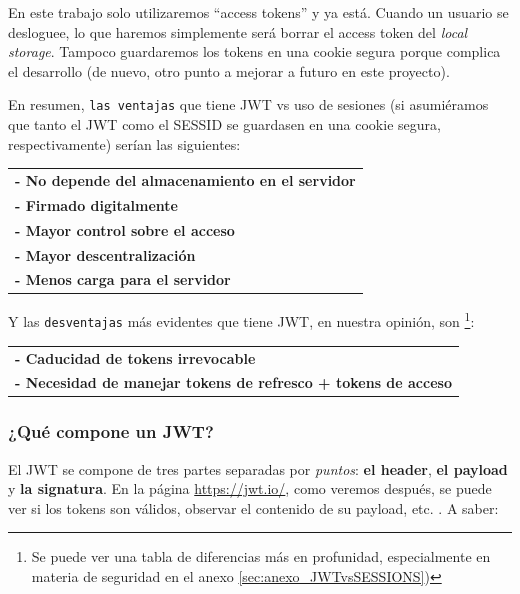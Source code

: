 \documentclass[a4paper,12pt]{report}
\begin{document}
				
				
				En este trabajo solo utilizaremos ``access tokens'' y ya está. Cuando un usuario se desloguee, lo que haremos simplemente será borrar el access token del \textit{local storage}. Tampoco guardaremos los tokens en una cookie segura porque complica el desarrollo (de nuevo, otro punto a mejorar a futuro en este proyecto).
			
				 
				 \noindent En resumen, \texttt{las ventajas} que tiene JWT vs uso de sesiones (si asumiéramos que tanto el JWT como el SESSID se guardasen en una cookie segura, respectivamente) serían las siguientes:
				 
					\begin{tabular}{l}
						\textbf{- No depende del almacenamiento en el servidor} \\
						\textbf{- Firmado digitalmente} \\
						\textbf{- Mayor control sobre el acceso} \\
						\textbf{- Mayor descentralización} \\
						\textbf{- Menos carga para el servidor}
					\end{tabular}
									 
				   \noindent Y las \texttt{desventajas} más evidentes que tiene JWT, en nuestra opinión, son \footnote{Se puede ver una tabla de diferencias más en profunidad, especialmente en materia de seguridad en el anexo \ref{sec:anexo_JWTvsSESSIONS})}:
				  
				  \begin{tabular}{l}
					 \textbf{- Caducidad de tokens irrevocable}\\
					 \textbf{- Necesidad de manejar tokens de refresco + tokens de acceso}
				  \end{tabular}
				 

				
				
				
				\subsubsection{¿Qué compone un JWT?}
				\label{sec:queComponeJWTbackend}
				
				\noindent El JWT se compone de tres partes separadas por \textit{puntos}: \textbf{el header}, \textbf{el payload} y \textbf{la signatura}. En la página \href{https://jwt.io/}{https://jwt.io/}, como veremos después, se puede ver si los tokens son válidos, observar el contenido de su payload, etc. \cite{jwtio}. A saber:
				
\end{document}
